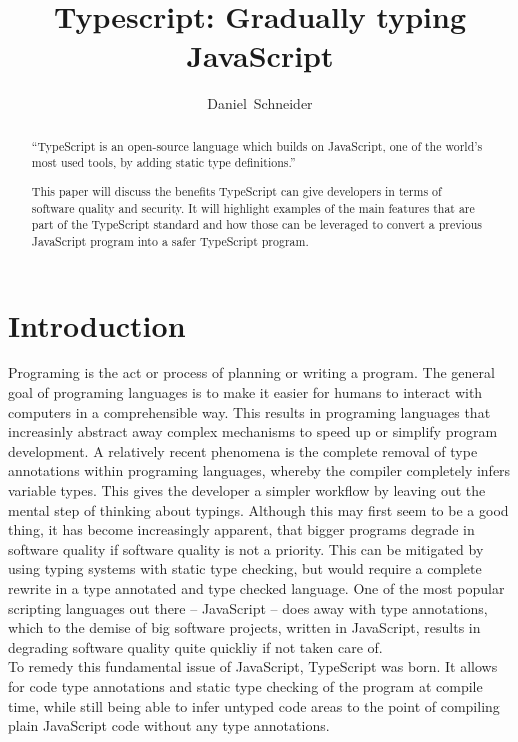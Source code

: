 \documentclass[letterpaper,runningheads]{llncs}
\begin{document}


\title{Typescript: Gradually typing JavaScript}
\author{Daniel~Schneider}
\maketitle
\begin{abstract}
``TypeScript is an open-source language which builds on JavaScript, one of the world’s most used tools, by adding static type definitions.''\cite{ref_ts_homepage}

This paper will discuss the benefits TypeScript can give developers
in terms of software quality and security. It will highlight examples
of the main features that are part of the TypeScript standard and
how those can be leveraged to convert a previous JavaScript program
into a safer TypeScript program.

\end{abstract}

\section{Introduction}

Programing is the act or process of planning or writing a program\cite{ref_programing_def}.
The general goal of programing languages is to make it easier for
humans to interact with computers in a comprehensible way. This results
in programing languages that increasinly abstract away complex mechanisms
to speed up or simplify program development. A relatively recent phenomena
is the complete removal of type annotations within programing languages,
whereby the compiler completely infers variable types. This gives
the developer a simpler workflow by leaving out the mental step of
thinking about typings. Although this may first seem to be a good
thing, it has become increasingly apparent, that bigger programs degrade
in software quality if software quality is not a priority. This can
be mitigated by using typing systems with static type checking, but
would require a complete rewrite in a type annotated and type checked
language. One of the most popular scripting languages out there --
JavaScript -- does away with type annotations, which to the demise
of big software projects, written in JavaScript, results in degrading
software quality quite quickliy if not taken care of. \\
To remedy this fundamental issue of JavaScript, TypeScript was born.
It allows for code type annotations and static type checking of the
program at compile time, while still being able to infer untyped code
areas to the point of compiling plain JavaScript code without any
type annotations. 
\end{document}

